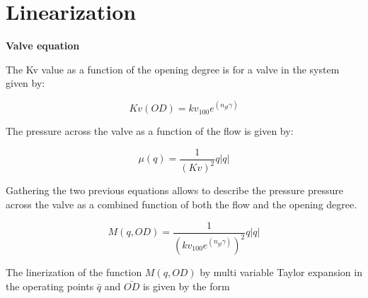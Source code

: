 \chapter{Linearization}
\label{chap:Lin}

\textbf{Valve equation}

The Kv value as a function of the opening degree is for a valve in the system given by:

\begin{equation}
	Kv(OD)=kv_{100} e^{(n_{gl} \gamma)}
\end{equation}


The pressure across the valve as a function of the flow is given by:

\begin{equation}
	\mu(q)=\frac{1}{(Kv)^2} q |q|
\end{equation}

Gathering the two previous equations allows to describe the pressure pressure across the valve as a combined function of both the flow and the opening degree.

\begin{equation}
	M(q,OD)=\frac{1}{(kv_{100} e^{(n_{gl} \gamma)})^2} q |q| 
\end{equation}	


The linerization of the function $M(q,OD)$ by multi variable Taylor expansion in the operating points $\bar{q}$ and $\bar{OD}$ is given by the form


